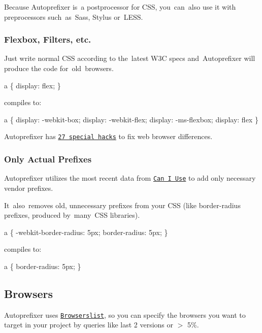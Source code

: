 Because Autoprefixer is a postprocessor for C\+SS, you can also use it with preprocessors such as \+Sass, Stylus or \+L\+E\+SS.

\subsubsection*{Flexbox, Filters, etc.}

Just write normal C\+SS according to the latest W3C specs and \+Autoprefixer will produce the code for old browsers.


\begin{DoxyCode}
a \{
    display: flex;
\}
\end{DoxyCode}


compiles to\+:


\begin{DoxyCode}
a \{
    display: -webkit-box;
    display: -webkit-flex;
    display: -ms-flexbox;
    display: flex
\}
\end{DoxyCode}


Autoprefixer has \href{https://github.com/postcss/autoprefixer/tree/master/lib/hacks}{\tt 27 special hacks} to fix web browser differences.

\subsubsection*{Only Actual Prefixes}

Autoprefixer utilizes the most recent data from \href{http://caniuse.com/}{\tt Can I Use} to add only necessary vendor prefixes.

It also removes old, unnecessary prefixes from your C\+SS (like {\ttfamily border-\/radius} prefixes, produced by many \+C\+SS libraries).


\begin{DoxyCode}
a \{
    -webkit-border-radius: 5px;
            border-radius: 5px;
\}
\end{DoxyCode}


compiles to\+:


\begin{DoxyCode}
a \{
    border-radius: 5px;
\}
\end{DoxyCode}


\subsection*{Browsers}

Autoprefixer uses \href{https://github.com/ai/browserslist}{\tt Browserslist}, so you can specify the browsers you want to target in your project by queries like {\ttfamily last 2 versions} or {\ttfamily $>$ 5\%}.

